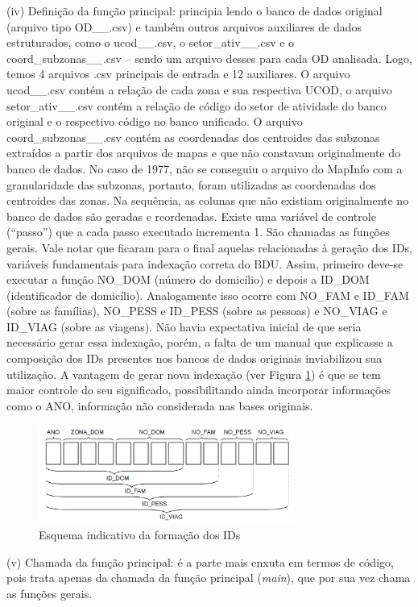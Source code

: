 \begin{compactitem}[]
\item (iv) Definição da função principal: principia lendo o banco de dados original (arquivo tipo OD__.csv) e também outros arquivos auxiliares de dados estruturados, como o ucod__.csv, o setor_ativ__.csv e o coord_subzonas__.csv – sendo um arquivo desses para cada OD analisada. Logo, temos 4 arquivos .csv principais de entrada e 12 auxiliares. O arquivo ucod__.csv contém a relação de cada zona e sua respectiva UCOD, o arquivo setor_ativ__.csv contém a relação de código do setor de atividade do banco original e o respectivo código no banco unificado. O arquivo coord_subzonas__.csv contém as coordenadas dos centroides das subzonas extraídos a partir dos arquivos de mapas e que não constavam originalmente do banco de dados. No caso de 1977, não se conseguiu o arquivo do MapInfo com a granularidade das subzonas, portanto, foram utilizadas as coordenadas dos centroides das zonas. Na sequência, as colunas que não existiam originalmente no banco de dados são geradas e reordenadas. Existe uma variável de controle (``passo'') que a cada passo executado incrementa 1. São chamadas as funções gerais. Vale notar que ficaram para o final aquelas relacionadas à geração dos IDs, variáveis fundamentais para indexação correta do BDU. Assim, primeiro deve-se executar a função NO_DOM (número do domicílio) e depois a ID_DOM (identificador de domicílio). Analogamente isso ocorre com NO_FAM e ID_FAM (sobre as famílias), NO_PESS e ID_PESS (sobre as pessoas) e NO_VIAG e ID_VIAG (sobre as viagens). Não havia expectativa inicial de que seria necessário gerar essa indexação, porém, a falta de um manual que explicasse a composição dos IDs presentes nos bancos de dados originais inviabilizou sua utilização. A vantagem de gerar nova indexação (ver Figura \ref{fig:id-esquema}) é que se tem maior controle do seu significado, possibilitando ainda incorporar informações como o ANO, informação não considerada nas bases originais.\\

\begin{figure}[htb]%
    \caption{\label{fig:id-esquema}Esquema indicativo da formação dos IDs}%
    \begin{center}%
        \includegraphics[width=0.75\textwidth]{./imagens/esquema-ID.png}%
    \end{center}%
\end{figure}%

\item (v) Chamada da função principal: é a parte mais enxuta em termos de código, pois trata apenas da chamada da função principal (\textit{main}), que por sua vez chama as funções gerais.

\end{compactitem} 

